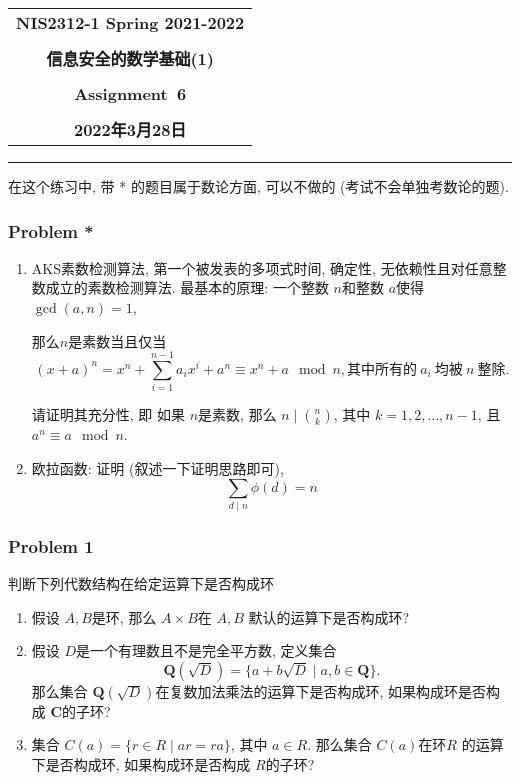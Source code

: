 \documentclass[a4paper,12pt]{ctexart}
\newcommand{\Com}{\mathbf{C}}
\newcommand{\Q}{\mathbf{Q}}
\begin{document}
  \begin{center}

  \vspace{-0.3in}
  \begin{tabular}{c}
    \textbf{\Large NIS2312-1 Spring 2021-2022} \\
    \textbf{\Large  } \\
    \textbf{\Large  信息安全的数学基础(1)} \\
    \textbf{\Large  } \\
    \textbf{\Large  Assignment~6} \\
    \textbf{\Large  } \\
    \textbf{\Large 2022年3月28日} \\
  \end{tabular}
  \end{center}
  \noindent
  \rule{\linewidth}{0.4pt}

  在这个练习中, 带 * 的题目属于数论方面, 可以不做的 (考试不会单独考数论的题).  
\subsubsection*{Problem *}
  \begin{enumerate}
    \item AKS素数检测算法, 第一个被发表的多项式时间, 确定性, 无依赖性且对任意整数成立的素数检测算法.
    最基本的原理: 一个整数 $ n $和整数 $ a $使得 $ \gcd(a,n)=1 $, 
    
    那么$ n $是素数当且仅当 
    \[ (x+a)^n=x^n+\sum_{i=1}^{n-1}a_ix^i +a^n\equiv x^n+a \mod{n},\text{其中所有的}~a_i~\text{均被}~n~\text{整除}. \]
    
    请证明其充分性, 即 如果 $ n $是素数, 那么 $ n\mid \binom{n}{k} $, 其中 $ k=1,2,\dots,n-1 $, 且 $ a^n\equiv a\mod{n} $.
    \item 欧拉函数: 证明 (叙述一下证明思路即可), \[\sum_{d\mid n}\phi(d)=n\] 
  \end{enumerate}    
\subsubsection*{Problem 1}
    判断下列代数结构在给定运算下是否构成环
    \begin{enumerate}
      \item 假设 $ A,B $是环, 那么 $ A\times B $在 $ A,B $ 默认的运算下是否构成环?
      \item 假设 $ D $是一个有理数且不是完全平方数, 定义集合
      \[\Q(\sqrt{D})=\{a+b\sqrt{D}\mid a,b\in\Q\}.\]
      那么集合 $ \Q(\sqrt{D}) $在复数加法乘法的运算下是否构成环, 如果构成环是否构成 $ \Com $的子环?
      \item 集合 $ C(a)=\{r\in R\mid ar=ra\} $, 其中 $ a\in R $. 那么集合 $ C(a) $在环$ R $ 的运算下是否构成环, 如果构成环是否构成 $ R $的子环?
    \end{enumerate}
\end{document}
